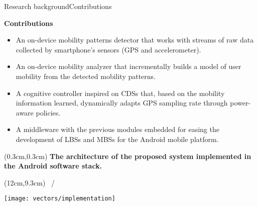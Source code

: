 \begin{frame}{Research background}{Contributions}
\small
\begin{block}{\small \textbf{Contributions}}
\begin{itemize}
  \item An on-device mobility patterns detector that works with streams of raw data collected by smartphone's sensors (GPS and accelerometer).
  \item An on-device mobility analyzer that incrementally builds a model of user mobility from the detected mobility patterns.
  \item A cognitive controller inspired on CDSs that, based on the mobility information learned, dynamically adapts GPS sampling rate through power-aware policies. 
  \item A middleware with the previous modules embedded for easing the development of LBSs and MBSs for the Android mobile platform.
\end{itemize}
\end{block}
\end{frame}

{\aauwavesbg%
  \begin{textblock*}{5cm}(0.3cm,0.3cm)
  \small
  \textbf{The architecture of the proposed system implemented in the Android software stack.}
  \end{textblock*}
\begin{textblock*}{1cm}(12cm,9.3cm)
  \scriptsize
  \insertframenumber~/~\inserttotalframenumber
  \end{textblock*}
\begin{frame}[plain]
  \centering
  \texttt{[image: vectors/implementation]}
\end{frame}}

